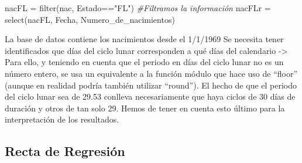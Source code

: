 \documentclass[
]{article}
\newenvironment{Shaded}{\begin{snugshade}}{\end{snugshade}}
\newcommand{\CommentTok}[1]{\textcolor[rgb]{0.56,0.35,0.01}{\textit{#1}}}
\newcommand{\DecValTok}[1]{\textcolor[rgb]{0.00,0.00,0.81}{#1}}
\newcommand{\FloatTok}[1]{\textcolor[rgb]{0.00,0.00,0.81}{#1}}
\newcommand{\FunctionTok}[1]{\textcolor[rgb]{0.00,0.00,0.00}{#1}}
\newcommand{\NormalTok}[1]{#1}
\newcommand{\OtherTok}[1]{\textcolor[rgb]{0.56,0.35,0.01}{#1}}
\newcommand{\SpecialCharTok}[1]{\textcolor[rgb]{0.00,0.00,0.00}{#1}}
\newcommand{\StringTok}[1]{\textcolor[rgb]{0.31,0.60,0.02}{#1}}
\begin{document}
\begin{Shaded}
\begin{Highlighting}[]
\NormalTok{nacFL }\OtherTok{=} \FunctionTok{filter}\NormalTok{(nac, Estado}\SpecialCharTok{==}\StringTok{"FL"}\NormalTok{) }\CommentTok{\#Filtramos la información}
\NormalTok{nacFLr }\OtherTok{=} \FunctionTok{select}\NormalTok{(nacFL, Fecha, Numero\_de\_nacimientos)}
\end{Highlighting}
\end{Shaded}

La base de datos contiene los nacimientos desde el 1/1/1969 Se necesita
tener identificados que días del ciclo lunar corresponden a qué días del
calendario -\textgreater{} Para ello, y teniendo en cuenta que el
periodo en días del ciclo lunar no es un número entero, se usa un
equivalente a la función módulo que hace uso de ``floor'' (aunque en
realidad podría también utilizar ``round''). El hecho de que el periodo
del ciclo lunar sea de 29.53 conlleva necesariamente que haya ciclos de
30 días de duración y otros de tan solo 29. Hemos de tener en cuenta
esto último para la interpretación de los resultados.

\begin{Shaded}
\end{Shaded}

\hypertarget{recta-de-regresiuxf3n}{%
\subsection{Recta de Regresión}\label{recta-de-regresiuxf3n}}
\end{document}
